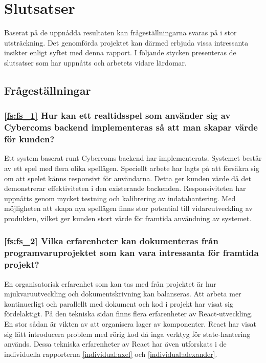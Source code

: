 \chapter{Slutsatser}
\label{cha:slutsatser}

Baserat på de uppnådda resultaten kan frågeställningarna svaras på i stor utsträckning. Det genomförda projektet kan därmed erbjuda vissa intressanta insikter enligt syftet med denna rapport. I följande stycken presenteras de slutsatser som har uppnåtts och arbetets vidare lärdomar.

\section{Frågeställningar}

\subsection*{\ref{fs:fs_1} Hur kan ett realtidsspel som använder sig av Cybercoms backend implementeras så att man skapar värde för kunden?}

Ett system baserat runt Cybercoms backend har implementerats. Systemet består av ett spel med flera olika spellägen. Speciellt arbete har lagts på att försäkra sig om att spelet känns responsivt för användarna. Detta ger kunden värde då det demonstrerar effektiviteten i den existerande backenden. Responsiviteten har uppnåtts genom mycket testning och kalibrering av indatahantering. Med möjligheten att skapa nya spellägen finns stor potential till vidareutveckling av produkten, vilket ger kunden stort värde för framtida användning av systemet.

\subsection*{\ref{fs:fs_2} Vilka erfarenheter kan dokumenteras från programvaruprojektet som kan vara intressanta för framtida projekt?}

En organisatorisk erfarenhet som kan tas med från projektet är hur mjukvaruutveckling och dokumentskrivning kan balanseras. Att arbeta mer kontinuerligt och parallellt med dokument och kod i projekt har visat sig fördelaktigt. På den tekniska sidan finns flera erfarenheter av React-utveckling. En stor sådan är vikten av att organisera lager av komponenter. React har visat sig lätt introducera problem med rörig kod då inga verktyg för state-hantering används. Dessa tekniska erfarenheter av React har även utforskats i de individuella rapporterna \ref{individual:axel} och \ref{individual:alexander}.

